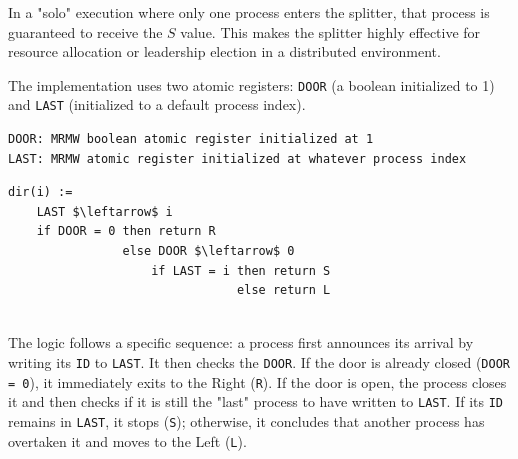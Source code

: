 In a "solo" execution where only one process enters the splitter, that process is guaranteed to receive the $S$ value. This makes the splitter highly effective for resource allocation or leadership election in a distributed environment.

The implementation uses two atomic registers: \texttt{DOOR} (a boolean initialized to 1) and \texttt{LAST} (initialized to a default process index).

\begin{minipage}{\textwidth}
\begin{lstlisting}[mathescape]
DOOR: MRMW boolean atomic register initialized at 1
LAST: MRMW atomic register initialized at whatever process index
\end{lstlisting}
\begin{lstlisting}[mathescape]
dir(i) :=
    LAST $\leftarrow$ i
    if DOOR = 0 then return R
                else DOOR $\leftarrow$ 0
                    if LAST = i then return S
                                else return L
\end{lstlisting}
\end{minipage}\\

The logic follows a specific sequence: a process first announces its arrival by writing its \texttt{ID} to \texttt{LAST}. It then checks the \texttt{DOOR}. If the door is already closed (\texttt{DOOR = 0}), it immediately exits to the Right (\texttt{R}). If the door is open, the process closes it and then checks if it is still the "last" process to have written to \texttt{LAST}. If its \texttt{ID} remains in \texttt{LAST}, it stops (\texttt{S}); otherwise, it concludes that another process has overtaken it and moves to the Left (\texttt{L}).


